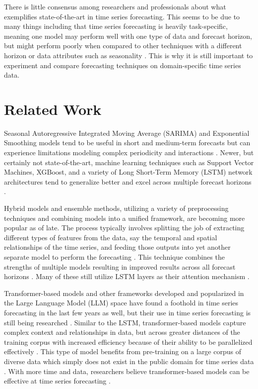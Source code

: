 \documentclass[sigconf]{acmart}
\begin{document}
There is little consensus among researchers and professionals about what exemplifies state-of-the-art in time series forecasting. This seems to be due to many things including that time series forecasting is heavily task-specific, meaning one model may perform well with one type of data and forecast horizon, but might perform poorly when compared to other techniques with a different horizon or data attributes such as seasonality \cite{Yue21}. This is why it is still important to experiment and compare forecasting techniques on domain-specific time series data.

\section{Related Work}
Seasonal Autoregressive Integrated Moving Average (SARIMA) and Exponential Smoothing models tend to be useful in short and medium-term forecasts but can experience limitations modeling complex periodicity and interactions \cite{Muzaffar19, Hopf23}. Newer, but certainly not state-of-the-art, machine learning techniques such as Support Vector Machines, XGBoost, and a variety of Long Short-Term Memory (LSTM) network architectures tend to generalize better and excel across multiple forecast horizons \cite{Sun22, Muzaffar19}.

Hybrid models and ensemble methods, utilizing a variety of preprocessing techniques and combining models into a unified framework, are becoming more popular as of late. The process typically involves splitting the job of extracting different types of features from the data, say the temporal and spatial relationships of the time series, and feeding those outputs into yet another separate model to perform the forecasting \cite{Hua23}. This technique combines the strengths of multiple models resulting in improved results across all forecast horizons \cite{Hua23, Hopf23}. Many of these still utilize LSTM layers as their attention mechanism \cite{Sun22}.

Transformer-based models and other frameworks developed and popularized in the Large Language Model (LLM) space have found a foothold in time series forecasting in the last few years as well, but their use in time series forecasting is still being researched \cite{Zeng22}. Similar to the LSTM, transformer-based models capture complex context and relationships in data, but across greater distances of the training corpus with increased efficiency because of their ability to be parallelized effectively \cite{Zheng24}. This type of model benefits from pre-training on a large corpus of diverse data which simply does not exist in the public domain for time series data \cite{Hug24}. With more time and data, researchers believe transformer-based models can be effective at time series forecasting \cite{Hug24, Zheng24}.
\end{document}
